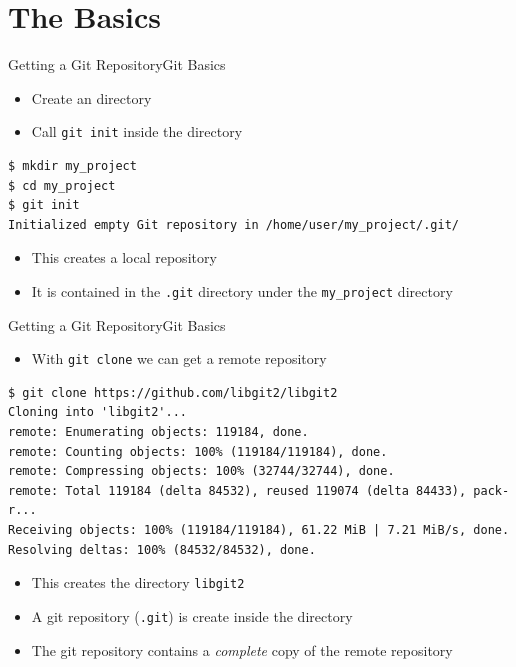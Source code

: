\documentclass[aspectratio=169]{beamer}
\begin{document}
\section{The Basics}
\begin{frame}[fragile]{Getting a Git Repository}{Git Basics}
\begin{itemize}
    \item Create an directory
    \item Call \verb|git init| inside the directory
\end{itemize}
\begin{verbatim}
$ mkdir my_project
$ cd my_project
$ git init
Initialized empty Git repository in /home/user/my_project/.git/
\end{verbatim}
\begin{itemize}
    \item This creates a local repository
    \item It is contained in the \verb|.git| directory under the \verb|my_project| directory
\end{itemize}
\end{frame}

\begin{frame}[fragile]{Getting a Git Repository}{Git Basics}
\begin{itemize}
    \item With \verb|git clone| we can get a remote repository
\end{itemize}
\begin{verbatim}
$ git clone https://github.com/libgit2/libgit2
Cloning into 'libgit2'...
remote: Enumerating objects: 119184, done.
remote: Counting objects: 100% (119184/119184), done.
remote: Compressing objects: 100% (32744/32744), done.
remote: Total 119184 (delta 84532), reused 119074 (delta 84433), pack-r...
Receiving objects: 100% (119184/119184), 61.22 MiB | 7.21 MiB/s, done.
Resolving deltas: 100% (84532/84532), done.
\end{verbatim}
\begin{itemize}
    \item This creates the directory \verb|libgit2|
    \item A git repository (\verb|.git|) is create inside the directory
    \item The git repository contains a \emph{complete} copy of the remote repository
\end{itemize}
\end{frame}
\end{document}
